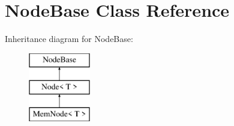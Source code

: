 \hypertarget{classNodeBase}{}\section{Node\+Base Class Reference}
\label{classNodeBase}
Inheritance diagram for Node\+Base\+:\begin{figure}[H]
\begin{center}
\leavevmode
\includegraphics[height=3.000000cm]{classNodeBase}
\end{center}
\end{figure}
